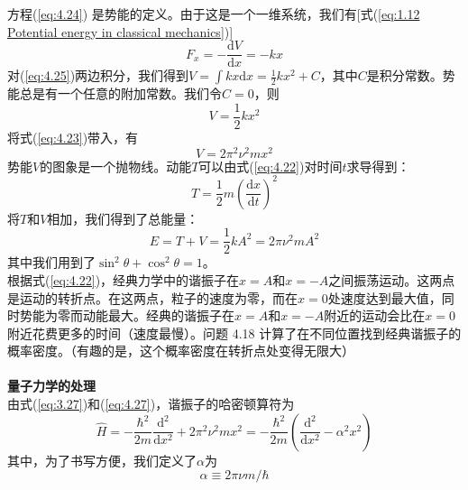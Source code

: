     方程(\ref{eq:4.24}) 是势能的定义。由于这是一个一维系统，我们有[式(\ref{eq:1.12 Potential energy in classical mechanics})]
    \begin{equation}
        F_x = -\frac{\mathrm{d}V}{\mathrm{d}x} = -kx
        \label{eq:4.25}
    \end{equation}
    对(\ref{eq:4.25})两边积分，我们得到$V = \int kx \mathrm{d}x = \frac{1}{2}kx^2 + C$，其中$C$是积分常数。势能总是有一个任意的附加常数。我们令$C = 0$，则
    \begin{equation}
        \boxed{
            V = \frac{1}{2}kx^2
        }
        \label{eq:4.26}
    \end{equation}
    将式(\ref{eq:4.23})带入，有
    \begin{equation}
        V = 2\pi^2 \nu^2 m x^2
        \label{eq:4.27}
    \end{equation}
    势能$V$的图象是一个抛物线。动能$T$可以由式(\ref{eq:4.22})对时间$t$求导得到：
    \begin{equation}
        T = \frac{1}{2}m\left(\frac{\mathrm{d}x}{\mathrm{d}t}\right)^2
        \label{eq:4.28}
    \end{equation}
    将$T$和$V$相加，我们得到了总能量：
    \begin{equation}
        E = T + V = \frac{1}{2}kA^2 = 2\pi\nu^2mA^2
        \label{eq:4.29}
    \end{equation}
    其中我们用到了$\sin^2\theta + \cos^2\theta = 1$。\\
    \indent 根据式(\ref{eq:4.22})，经典力学中的谐振子在$x=A$和$x=-A$之间振荡运动。这两点是运动的转折点。在这两点，粒子的速度为零，而在$x=0$处速度达到最大值，同时势能为零而动能最大。经典的谐振子在$x=A$和$x=-A$附近的运动会比在$x=0$附近花费更多的时间（速度最慢）。问题 4.18 计算了在不同位置找到经典谐振子的概率密度。（有趣的是，这个概率密度在转折点处变得无限大）\\
    \\
    \textbf{量子力学的处理}\\
    由式(\ref{eq:3.27})和(\ref{eq:4.27})，谐振子的哈密顿算符为
    \begin{equation}
        \hat{H} = -\frac{\hbar^2}{2m}\frac{\mathrm{d}^2}{\mathrm{d}x^2} + 2\pi^2 \nu^2 m x^2 = -\frac{\hbar^2}{2m}\left(\frac{\mathrm{d}^2}{\mathrm{d}x^2} - \alpha^2x^2\right)
        \label{eq:4.30}
    \end{equation}
    其中，为了书写方便，我们定义了$\alpha$为
    \begin{equation}
        \alpha \equiv 2\pi\nu m/\hbar
        \label{eq:4.31}
    \end{equation}
